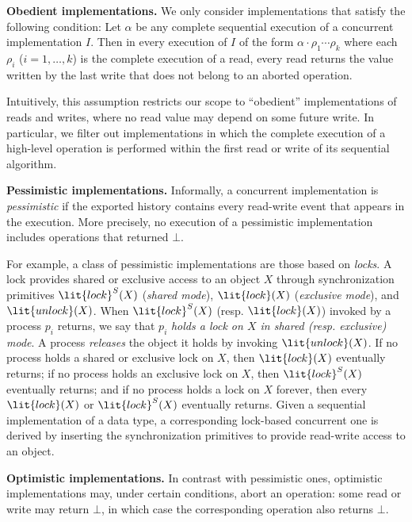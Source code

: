 \documentclass[11pt,pdftex,letterpaper]{article}
\begin{document}
\vspace{1mm}\noindent\textbf{Obedient implementations.}
We only consider implementations that satisfy the following condition:
Let $\alpha$ be any complete sequential execution of a concurrent implementation $I$.
Then in every execution of $I$ of the form $\alpha\cdot\rho_1\cdots \rho_k$
where each $\rho_i$ ($i=1,\ldots,k$) is the complete execution of a
read, every read returns the value written by the last write that does
not belong to an aborted operation.

Intuitively, this assumption restricts our scope to
``obedient'' implementations of reads and writes, where no
read value may depend on some future write.   
In particular, we filter out implementations in which the
complete execution of a high-level operation is performed within the
first read or write of its sequential algorithm.

\vspace{1mm}\noindent\textbf{Pessimistic implementations.}
Informally, a concurrent implementation is \emph{pessimistic} if the exported history contains
every read-write event that appears in the execution. 
More precisely, no execution of a pessimistic implementation includes
operations that returned $\bot$.  

For example, a class of pessimistic implementations are those based on \emph{locks}.
A lock provides
shared or exclusive access to an object $X$ through 
synchronization primitives $\lit{lock}^S(X)$ (\emph{shared mode}),
$\lit{lock}(X)$ (\emph{exclusive mode}),  
and $\lit{unlock}(X)$.
When $\lit{lock}^S(X)$ (resp. $\lit{lock}(X)$) invoked
by a process $p_i$ returns, we say that $p_i$ \emph{holds
a lock on $X$ in shared (resp. exclusive) mode}.
A process \emph{releases} the object it holds by invoking
$\lit{unlock}(X)$.  
If no process holds a shared or exclusive
lock on $X$, then $\lit{lock}(X)$
eventually returns;
if no process holds an exclusive
lock on $X$, then $\lit{lock}^S(X)$
eventually returns; and
if no process holds a
lock on $X$ forever, then every $\lit{lock}(X)$ or $\lit{lock}^S(X)$
eventually returns. 
Given a sequential implementation of a data type, 
a corresponding lock-based concurrent one 
is derived by inserting the synchronization primitives
to provide read-write access to an object. 

\vspace{1mm}\noindent\textbf{Optimistic implementations.}
In contrast with pessimistic ones, optimistic implementations may, under
certain conditions, abort an operation:
some read or write may return $\bot$,
in which case the corresponding operation also returns $\bot$.
\end{document}
